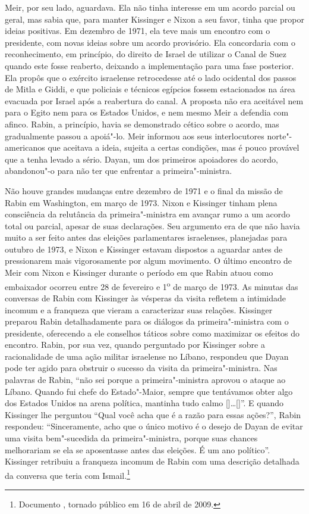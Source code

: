 Meir, por seu lado, aguardava. Ela não tinha interesse em um acordo
parcial ou geral, mas sabia que, para manter Kissinger e Nixon a seu
favor, tinha que propor ideias positivas. Em dezembro de 1971, ela teve
mais um encontro com o presidente, com novas ideias sobre um acordo
provisório. Ela concordaria com o reconhecimento, em princípio, do
direito de Israel de utilizar o Canal de Suez quando este fosse
reaberto, deixando a implementação para uma fase posterior. Ela propôs
que o exército israelense retrocedesse até o lado ocidental dos passos
de Mitla e Giddi, e que policiais e técnicos egípcios fossem estacionados
na área evacuada por Israel após a reabertura do canal. A proposta não
era aceitável nem para o Egito nem para os Estados Unidos, e nem mesmo Meir a
defendia com afinco. Rabin, a princípio, havia se demonstrado cético sobre
o acordo, mas gradualmente passou a apoiá"-lo. Meir informou aos seus
interlocutores norte"-americanos que aceitava a ideia, sujeita a certas
condições, mas é pouco provável que a tenha levado a sério. Dayan,
um dos primeiros apoiadores do acordo, abandonou"-o para não ter que
enfrentar a primeira"-ministra.

Não houve grandes mudanças entre dezembro de 1971 e o final da missão de
Rabin em Washington, em março de 1973. Nixon e Kissinger tinham plena
consciência da relutância da primeira"-ministra em avançar rumo a um
acordo total ou parcial, apesar de suas declarações. Seu argumento era
de que não havia muito a ser feito antes das eleições parlamentares
israelenses, planejadas para outubro de 1973, e Nixon e Kissinger estavam
dispostos a aguardar antes de pressionarem mais vigorosamente por algum
movimento. O último encontro de Meir com Nixon e Kissinger durante o
período em que Rabin atuou como embaixador ocorreu entre 28 de fevereiro e
1\textsuperscript{o} de março de 1973. As minutas das conversas de
Rabin com Kissinger às vésperas da visita refletem a intimidade incomum
e a franqueza que vieram a caracterizar suas relações. Kissinger
preparou Rabin detalhadamente para os diálogos da primeira"-ministra com
o presidente, oferecendo a ele conselhos táticos sobre como maximizar os
efeitos do encontro. Rabin, por sua vez, quando perguntado por Kissinger
sobre a racionalidade de uma ação militar israelense no Líbano,
respondeu que Dayan pode ter agido para obstruir o sucesso da visita da
primeira"-ministra. Nas palavras de Rabin, ``não sei porque a primeira"-ministra
aprovou o ataque ao Líbano. Quando fui chefe do Estado"-Maior,
sempre que tentávamos obter algo dos Estados Unidos na arena política,
mantinha tudo calmo [{]\ldots{}[}]''. E quando Kissinger lhe perguntou ``Qual você
acha que é a razão para essas ações?'', Rabin respondeu:
``Sinceramente, acho que o único motivo é o desejo de Dayan de evitar
uma visita bem"-sucedida da primeira"-ministra, porque suas chances
melhorariam se ela se aposentasse antes das eleições. É um ano
político''. Kissinger retribuiu a franqueza incomum de Rabin com uma
descrição detalhada da conversa que teria com Ismail.\footnote{Documento , tornado público em 16 de abril de 2009.}

